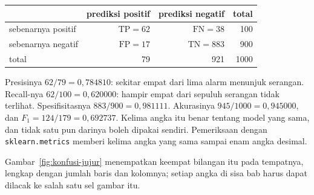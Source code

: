 \begin{center}
\small
\begin{tabular}{l|rr|r}
\hline
 & prediksi positif & prediksi negatif & total \\
\hline
sebenarnya positif & $\mathrm{TP}=62$ & $\mathrm{FN}=38$ & 100 \\
sebenarnya negatif & $\mathrm{FP}=17$ & $\mathrm{TN}=883$ & 900 \\
\hline
total & 79 & 921 & 1000 \\
\hline
\end{tabular}
\end{center}

Presisinya $62/79=0{,}784810$: sekitar empat dari lima alarm menunjuk serangan.
Recall-nya $62/100=0{,}620000$: hampir empat dari sepuluh serangan tidak terlihat.
Spesifisitasnya $883/900=0{,}981111$. Akurasinya $945/1000=0{,}945000$, dan
$F_1=124/179=0{,}692737$. Kelima angka itu benar tentang model yang sama, dan tidak satu
pun darinya boleh dipakai sendiri. Pemeriksaan dengan \texttt{sklearn.metrics} memberi
kelima angka yang sama sampai enam angka desimal.

Gambar~\ref{fig:konfusi-jujur} menempatkan keempat bilangan itu pada tempatnya, lengkap
dengan jumlah baris dan kolomnya; setiap angka di sisa bab harus dapat dilacak ke salah
satu sel gambar itu.

